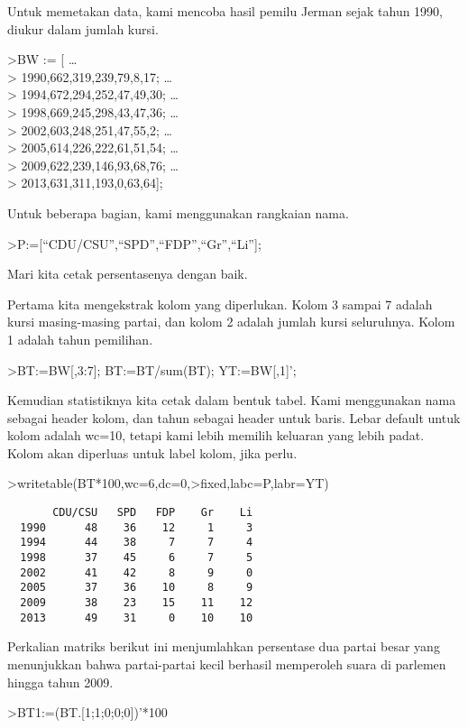 \documentclass[
]{book}
\begin{document}
Untuk memetakan data, kami mencoba hasil pemilu Jerman sejak tahun 1990, diukur dalam jumlah kursi.

\textgreater BW := {[} \ldots{}\\
\textgreater{} 1990,662,319,239,79,8,17; \ldots{}\\
\textgreater{} 1994,672,294,252,47,49,30; \ldots{}\\
\textgreater{} 1998,669,245,298,43,47,36; \ldots{}\\
\textgreater{} 2002,603,248,251,47,55,2; \ldots{}\\
\textgreater{} 2005,614,226,222,61,51,54; \ldots{}\\
\textgreater{} 2009,622,239,146,93,68,76; \ldots{}\\
\textgreater{} 2013,631,311,193,0,63,64{]};

Untuk beberapa bagian, kami menggunakan rangkaian nama.

\textgreater P:={[}``CDU/CSU'',``SPD'',``FDP'',``Gr'',``Li''{]};

Mari kita cetak persentasenya dengan baik.

Pertama kita mengekstrak kolom yang diperlukan. Kolom 3 sampai 7 adalah kursi masing-masing partai, dan kolom 2 adalah jumlah kursi seluruhnya. Kolom 1 adalah tahun pemilihan.

\textgreater BT:=BW{[},3:7{]}; BT:=BT/sum(BT); YT:=BW{[},1{]}';

Kemudian statistiknya kita cetak dalam bentuk tabel. Kami menggunakan nama sebagai header kolom, dan tahun sebagai header untuk baris. Lebar default untuk kolom adalah wc=10, tetapi kami lebih memilih keluaran yang lebih padat. Kolom akan diperluas untuk label kolom, jika perlu.

\textgreater writetable(BT*100,wc=6,dc=0,\textgreater fixed,labc=P,labr=YT)

\begin{verbatim}
       CDU/CSU   SPD   FDP    Gr    Li
  1990      48    36    12     1     3
  1994      44    38     7     7     4
  1998      37    45     6     7     5
  2002      41    42     8     9     0
  2005      37    36    10     8     9
  2009      38    23    15    11    12
  2013      49    31     0    10    10
\end{verbatim}

Perkalian matriks berikut ini menjumlahkan persentase dua partai besar yang menunjukkan bahwa partai-partai kecil berhasil memperoleh suara di parlemen hingga tahun 2009.

\textgreater BT1:=(BT.{[}1;1;0;0;0{]})'*100
\end{document}
